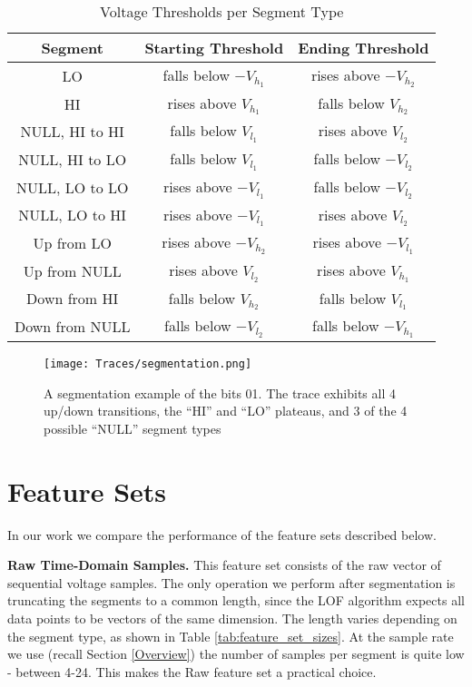 \documentclass[english]{llncs}
\newcommand{\level}[1]{\section{#1}}
\newcommand{\level}[1]{\chapter{#1}}
\begin{document}
  \begin{table}[t]
    \caption{Voltage Thresholds per Segment Type}
    \label{tab:SegmentationLevels}
    \centering
    \begin{tabular}{|c c c|} 
      \hline
      Segment & Starting Threshold & Ending Threshold \\ [0.5ex] 
      \hline\hline
      LO & falls below $-V_{h_1}$ & rises above $-V_{h_2}$ \\
      \hline
      HI & rises above $V_{h_1}$ & falls below $V_{h_2}$ \\
      \hline
      NULL, HI to HI & falls below $V_{l_1}$ & rises above $V_{l_2}$ \\
      \hline
      NULL, HI to LO & falls below $V_{l_1}$ & falls below $-V_{l_2}$ \\
      \hline
      NULL, LO to LO & rises above $-V_{l_1}$ & falls below $-V_{l_2}$ \\
      \hline
      NULL, LO to HI & rises above $-V_{l_1}$ & rises above $V_{l_2}$ \\
      \hline
      Up from LO & rises above $-V_{h_2}$ & rises above $-V_{l_1}$ \\
      \hline
      Up from NULL & rises above $V_{l_2}$ & rises above $V_{h_1}$ \\
      \hline
      Down from HI & falls below $V_{h_2}$ & falls below $V_{l_1}$ \\
      \hline
      Down from NULL & falls below $-V_{l_2}$ & falls below $-V_{h_1}$ \\
      \hline
    \end{tabular}
  \end{table}
  
  \begin{figure}[t]
  \centering
    \texttt{[image: Traces/segmentation.png]}
    \caption{}
    \label{fig:SegmentationTrace}
    \caption{A segmentation example of the bits 01. The trace exhibits all 4 up/down transitions, the ``HI'' and ``LO'' plateaus, and 3 of the 4 possible ``NULL'' segment types}
  \end{figure}
  
\level{Feature Sets} \label{FeatureSets}
  In our work we compare the performance of the feature sets described below.
 
{\bf Raw Time-Domain Samples.}
  This feature set consists of the raw vector of sequential voltage samples. The only %
  operation we perform after segmentation is truncating the segments to a common length, since the LOF algorithm expects all data points to be vectors of the same dimension. The length varies depending on the segment type, as shown in Table \ref{tab:feature_set_sizes}. At the sample rate we use (recall Section \ref{Overview}) the number of samples per segment is quite low - between 4-24. %
  This makes the Raw feature set a practical choice.
  
\end{document}
